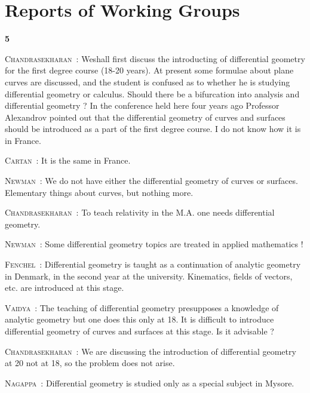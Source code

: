 \chapter{Reports of Working Groups}

\begin{center}
{\large\bf 5}
\end{center}
\medskip

\setcounter{pageoriginal}{192}
\noindent
\textsc{Chandrasekharan}~: We\pageoriginale shall first discuss the introducting of differential geometry for the first degree course (18-20 years). At present some formulae about plane curves are discussed, and the student is confused as to whether he is studying differential geometry or calculus. Should there be a bifurcation into analysis and differential geometry ? In the conference held here four years ago Professor Alexandrov pointed out that the differential geometry of curves and surfaces should be introduced as a part of the first degree course. I do not know how it is in France.

\smallskip
\noindent
\textsc{Cartan}~: It is the same in France.

\smallskip
\noindent
\textsc{Newman}~: We do not have either the differential geometry of curves or surfaces. Elementary things about curves, but nothing more.

\smallskip
\noindent
\textsc{Chandrasekharan}~: To teach relativity in the M.A. one needs differential geometry.

\smallskip
\noindent
\textsc{Newman}~: Some differential geometry topics are treated in applied mathematics !

\smallskip
\noindent
\textsc{Fenchel}~: Differential geometry is taught as a continuation of analytic geometry in Denmark, in the second year at the university. Kinematics, fields of vectors, etc. are introduced at this stage.

\smallskip
\noindent
\textsc{Vaidya}~: The teaching of differential geometry presupposes a knowledge of analytic geometry but one does this only at 18. It is difficult to introduce differential geometry of curves and surfaces at this stage. Is it advisable ?

\smallskip
\noindent
\textsc{Chandrasekharan}~: We are discussing the introduction of differential geometry at 20 not at 18, so the problem does not arise.

\smallskip
\noindent
\textsc{Nagappa}~: Differential geometry is studied only as a special subject in Mysore.

